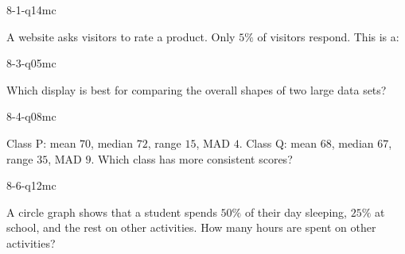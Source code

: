 \begin{practiceQuestion}{8-1-q14}{mc}
\begin{questionText}
A website asks visitors to rate a product. Only $5\%$ of visitors respond. This is a:
\end{questionText}
\end{practiceQuestion}

\begin{practiceQuestion}{8-3-q05}{mc}
\begin{questionText}
Which display is best for comparing the overall shapes of two large data sets?
\end{questionText}
\end{practiceQuestion}

\begin{practiceQuestion}{8-4-q08}{mc}
\begin{questionText}
Class P: mean $70$, median $72$, range $15$, MAD $4$.
Class Q: mean $68$, median $67$, range $35$, MAD $9$.
Which class has more consistent scores?
\end{questionText}
\end{practiceQuestion}

\begin{practiceQuestion}{8-6-q12}{mc}
\begin{questionText}
A circle graph shows that a student spends $50\%$ of their day sleeping, $25\%$ at school, and the rest on other activities. How many hours are spent on other activities?
\end{questionText}
\end{practiceQuestion}

